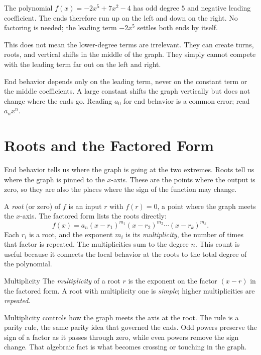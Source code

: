 \documentclass[12pt]{book}
\begin{document}
\begin{example}
The polynomial $f(x)=-2x^5+7x^2-4$ has odd degree $5$ and negative leading
coefficient. The ends therefore run up on the left and down on the right. No
factoring is needed; the leading term $-2x^5$ settles both ends by itself.
\end{example}

This does not mean the lower-degree terms are irrelevant. They can create turns,
roots, and vertical shifts in the middle of the graph. They simply cannot compete
with the leading term far out on the left and right.

\begin{pitfall}
End behavior depends only on the leading term, never on the constant term or the
middle coefficients. A large constant shifts the graph vertically but does not change
where the ends go. Reading $a_0$ for end behavior is a common error; read $a_n x^n$.
\end{pitfall}

\section{Roots and the Factored Form}

End behavior tells us where the graph is going at the two extremes. Roots tell us
where the graph is pinned to the $x$-axis. These are the points where the output is
zero, so they are also the places where the sign of the function may change.

A \emph{root} (or zero) of $f$ is an input $r$ with $f(r)=0$, a point where the graph
meets the $x$-axis. The factored form lists the roots directly:
\[
f(x)=a_n (x-r_1)^{m_1}(x-r_2)^{m_2}\cdots (x-r_k)^{m_k}.
\]
Each $r_i$ is a root, and the exponent $m_i$ is its \emph{multiplicity}, the number
of times that factor is repeated. The multiplicities sum to the degree $n$. This
count is useful because it connects the local behavior at the roots to the total
degree of the polynomial.

\begin{definition}{Multiplicity}
The \emph{multiplicity} of a root $r$ is the exponent on the factor $(x-r)$ in the
factored form. A root with multiplicity one is \emph{simple}; higher multiplicities
are \emph{repeated}.
\end{definition}

Multiplicity controls how the graph meets the axis at the root. The rule is a
parity rule, the same parity idea that governed the ends. Odd powers preserve the
sign of a factor as it passes through zero, while even powers remove the sign change.
That algebraic fact is what becomes crossing or touching in the graph.
\end{document}
